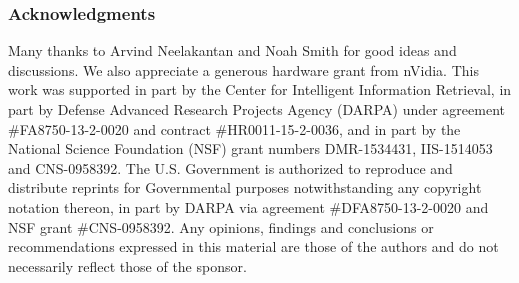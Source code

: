 \documentclass{article} %
\begin{document}
\subsubsection*{Acknowledgments}
Many thanks to Arvind Neelakantan and Noah Smith for good ideas and discussions. We also appreciate a generous hardware grant from nVidia. This work was supported in part by the Center for Intelligent Information Retrieval, in part by Defense Advanced Research Projects Agency (DARPA) under agreement \#FA8750-13-2-0020 and contract \#HR0011-15-2-0036, and in part by the National Science Foundation (NSF) grant numbers DMR-1534431, IIS-1514053 and CNS-0958392. The U.S. Government is authorized to reproduce and distribute reprints for Governmental purposes notwithstanding any copyright notation thereon, in part by DARPA via agreement \#DFA8750-13-2-0020 and NSF grant \#CNS-0958392. Any opinions, findings and conclusions or recommendations expressed in this material are those of the authors and do not necessarily reflect those of the sponsor.




\appendix

\end{document}
